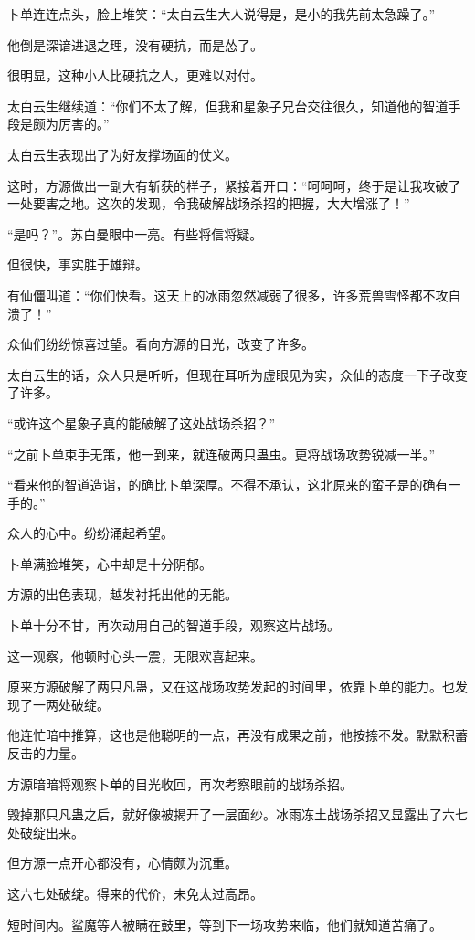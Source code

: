 \begin{this_body}
卜单连连点头，脸上堆笑：“太白云生大人说得是，是小的我先前太急躁了。”

他倒是深谙进退之理，没有硬抗，而是怂了。

很明显，这种小人比硬抗之人，更难以对付。

太白云生继续道：“你们不太了解，但我和星象子兄台交往很久，知道他的智道手段是颇为厉害的。”

太白云生表现出了为好友撑场面的仗义。

这时，方源做出一副大有斩获的样子，紧接着开口：“呵呵呵，终于是让我攻破了一处要害之地。这次的发现，令我破解战场杀招的把握，大大增涨了！”

“是吗？”。苏白曼眼中一亮。有些将信将疑。

但很快，事实胜于雄辩。

有仙僵叫道：“你们快看。这天上的冰雨忽然减弱了很多，许多荒兽雪怪都不攻自溃了！”

众仙们纷纷惊喜过望。看向方源的目光，改变了许多。

太白云生的话，众人只是听听，但现在耳听为虚眼见为实，众仙的态度一下子改变了许多。

“或许这个星象子真的能破解了这处战场杀招？”

“之前卜单束手无策，他一到来，就连破两只蛊虫。更将战场攻势锐减一半。”

“看来他的智道造诣，的确比卜单深厚。不得不承认，这北原来的蛮子是的确有一手的。”

众人的心中。纷纷涌起希望。

卜单满脸堆笑，心中却是十分阴郁。

方源的出色表现，越发衬托出他的无能。

卜单十分不甘，再次动用自己的智道手段，观察这片战场。

这一观察，他顿时心头一震，无限欢喜起来。

原来方源破解了两只凡蛊，又在这战场攻势发起的时间里，依靠卜单的能力。也发现了一两处破绽。

他连忙暗中推算，这也是他聪明的一点，再没有成果之前，他按捺不发。默默积蓄反击的力量。

方源暗暗将观察卜单的目光收回，再次考察眼前的战场杀招。

毁掉那只凡蛊之后，就好像被揭开了一层面纱。冰雨冻土战场杀招又显露出了六七处破绽出来。

但方源一点开心都没有，心情颇为沉重。

这六七处破绽。得来的代价，未免太过高昂。

短时间内。鲨魔等人被瞒在鼓里，等到下一场攻势来临，他们就知道苦痛了。


\end{this_body}
